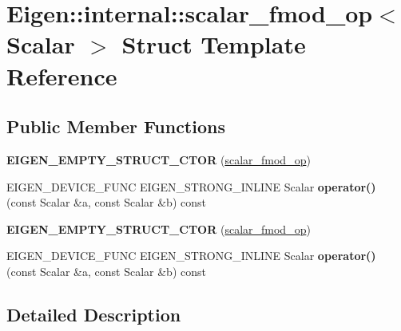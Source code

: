 \hypertarget{struct_eigen_1_1internal_1_1scalar__fmod__op}{}\section{Eigen\+:\+:internal\+:\+:scalar\+\_\+fmod\+\_\+op$<$ Scalar $>$ Struct Template Reference}
\label{struct_eigen_1_1internal_1_1scalar__fmod__op}
\subsection*{Public Member Functions}
\begin{DoxyCompactItemize}
\item 
\mbox{\label{struct_eigen_1_1internal_1_1scalar__fmod__op_aaa9d724eadaa52b31064fb4826f6e4c0}} 
{\bfseries E\+I\+G\+E\+N\+\_\+\+E\+M\+P\+T\+Y\+\_\+\+S\+T\+R\+U\+C\+T\+\_\+\+C\+T\+OR} (\hyperlink{struct_eigen_1_1internal_1_1scalar__fmod__op}{scalar\+\_\+fmod\+\_\+op})
\item 
\mbox{\label{struct_eigen_1_1internal_1_1scalar__fmod__op_abe66894cd9bff490262537ba3c31a04d}} 
E\+I\+G\+E\+N\+\_\+\+D\+E\+V\+I\+C\+E\+\_\+\+F\+U\+NC E\+I\+G\+E\+N\+\_\+\+S\+T\+R\+O\+N\+G\+\_\+\+I\+N\+L\+I\+NE Scalar {\bfseries operator()} (const Scalar \&a, const Scalar \&b) const
\item 
\mbox{\label{struct_eigen_1_1internal_1_1scalar__fmod__op_aaa9d724eadaa52b31064fb4826f6e4c0}} 
{\bfseries E\+I\+G\+E\+N\+\_\+\+E\+M\+P\+T\+Y\+\_\+\+S\+T\+R\+U\+C\+T\+\_\+\+C\+T\+OR} (\hyperlink{struct_eigen_1_1internal_1_1scalar__fmod__op}{scalar\+\_\+fmod\+\_\+op})
\item 
\mbox{\label{struct_eigen_1_1internal_1_1scalar__fmod__op_abe66894cd9bff490262537ba3c31a04d}} 
E\+I\+G\+E\+N\+\_\+\+D\+E\+V\+I\+C\+E\+\_\+\+F\+U\+NC E\+I\+G\+E\+N\+\_\+\+S\+T\+R\+O\+N\+G\+\_\+\+I\+N\+L\+I\+NE Scalar {\bfseries operator()} (const Scalar \&a, const Scalar \&b) const
\end{DoxyCompactItemize}


\subsection{Detailed Description}
